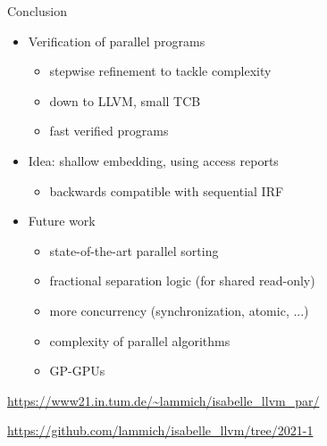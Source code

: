 \documentclass[fleqn]{beamer}
\newcommand{\high}[1]{{\color{blue}#1}}
\begin{document}
{

\begin{frame}{Conclusion}
  \begin{itemize}
   \item Verification of parallel programs
    \begin{itemize}
     \item stepwise refinement to tackle complexity
     \item down to LLVM, small TCB
     \item \high{fast} verified programs

    \end{itemize}
   \item Idea: shallow embedding, using access reports
    \begin{itemize}
     \item backwards compatible with sequential IRF

    \end{itemize}
   \item Future work
    \begin{itemize}
     \item state-of-the-art parallel sorting
     \item fractional separation logic (for shared read-only)
     \item more concurrency (synchronization, atomic, ...)
     \item complexity of parallel algorithms
     \item GP-GPUs

    \end{itemize}
  \end{itemize}
  \vfill
  \url{https://www21.in.tum.de/~lammich/isabelle_llvm_par/}

  \url{https://github.com/lammich/isabelle_llvm/tree/2021-1}


\end{frame}
}
\end{document}
